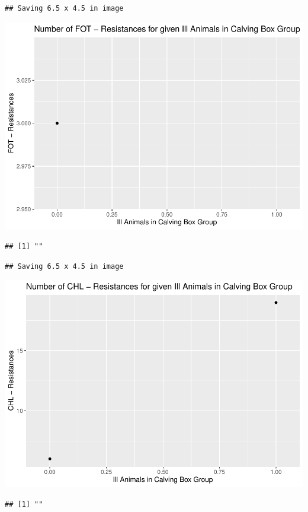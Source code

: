 \documentclass[
]{article}
\begin{document}
\begin{verbatim}
## Saving 6.5 x 4.5 in image
\end{verbatim}

\includegraphics{NResistenzen_files/figure-latex/binary_or_nominal_variables-25.pdf}

\begin{verbatim}
## [1] ""
\end{verbatim}

\begin{verbatim}
## Saving 6.5 x 4.5 in image
\end{verbatim}

\includegraphics{NResistenzen_files/figure-latex/binary_or_nominal_variables-26.pdf}

\begin{verbatim}
## [1] ""
\end{verbatim}
\end{document}
